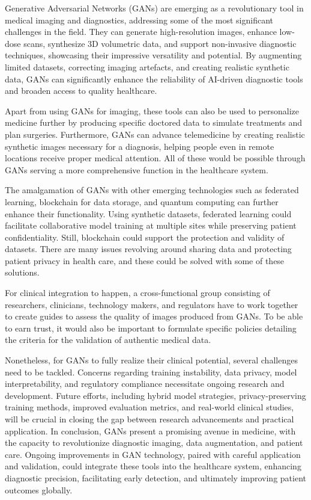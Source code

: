 \documentclass[12pt]{article}
\begin{document}
Generative Adversarial Networks (GANs) are emerging as a revolutionary tool in medical imaging and diagnostics, addressing some of the most significant challenges in the field. They can generate high-resolution images, enhance low-dose scans, synthesize 3D volumetric data, and support non-invasive diagnostic techniques, showcasing their impressive versatility and potential. By augmenting limited datasets, correcting imaging artefacts, and creating realistic synthetic data, GANs can significantly enhance the reliability of AI-driven diagnostic tools and broaden access to quality healthcare. 

Apart from using GANs for imaging, these tools can also be used to personalize medicine further by producing specific doctored data to simulate treatments and plan surgeries. Furthermore, GANs can advance telemedicine by creating realistic synthetic images necessary for a diagnosis, helping people even in remote locations receive proper medical attention. All of these would be possible through GANs serving a more comprehensive function in the healthcare system.

The amalgamation of GANs with other emerging technologies such as federated learning, blockchain for data storage, and quantum computing can further enhance their functionality. Using synthetic datasets, federated learning could facilitate collaborative model training at multiple sites while preserving patient confidentiality. Still, blockchain could support the protection and validity of datasets. There are many issues revolving around sharing data and protecting patient privacy in health care, and these could be solved with some of these solutions.

For clinical integration to happen, a cross-functional group consisting of researchers, clinicians, technology makers, and regulators have to work together to create guides to assess the quality of images produced from GANs. To be able to earn trust, it would also be important to formulate specific policies detailing the criteria for the validation of authentic medical data.

Nonetheless, for GANs to fully realize their clinical potential, several challenges need to be tackled. Concerns regarding training instability, data privacy, model interpretability, and regulatory compliance necessitate ongoing research and development. Future efforts, including hybrid model strategies, privacy-preserving training methods, improved evaluation metrics, and real-world clinical studies, will be crucial in closing the gap between research advancements and practical application.  In conclusion, GANs present a promising avenue in medicine, with the capacity to revolutionize diagnostic imaging, data augmentation, and patient care. Ongoing improvements in GAN technology, paired with careful application and validation, could integrate these tools into the healthcare system, enhancing diagnostic precision, facilitating early detection, and ultimately improving patient outcomes globally. \newpage



\end{document}
